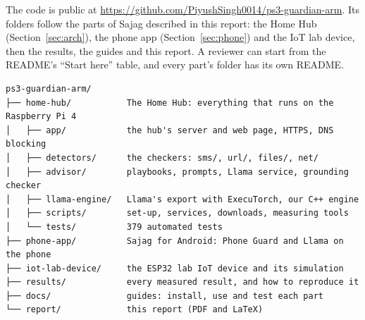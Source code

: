 \documentclass[11pt,a4paper]{article}
\newcommand{\repourl}{\url{https://github.com/PiyushSingh0014/ps3-guardian-arm}}
\begin{document}
The code is public at \repourl. Its folders follow the parts of Sajag described in this report: the Home Hub
(Section~\ref{sec:arch}), the phone app (Section~\ref{sec:phone}) and the IoT lab device, then the results, the guides
and this report. A reviewer can start from the README's ``Start here'' table, and every part's folder has its own README.

\begin{keybox}[title=How the repository is organised]
\small
\begin{verbatim}
ps3-guardian-arm/
├── home-hub/           The Home Hub: everything that runs on the Raspberry Pi 4
│   ├── app/            the hub's server and web page, HTTPS, DNS blocking
│   ├── detectors/      the checkers: sms/, url/, files/, net/
│   ├── advisor/        playbooks, prompts, Llama service, grounding checker
│   ├── llama-engine/   Llama's export with ExecuTorch, our C++ engine
│   ├── scripts/        set-up, services, downloads, measuring tools
│   └── tests/          379 automated tests
├── phone-app/          Sajag for Android: Phone Guard and Llama on the phone
├── iot-lab-device/     the ESP32 lab IoT device and its simulation
├── results/            every measured result, and how to reproduce it
├── docs/               guides: install, use and test each part
└── report/             this report (PDF and LaTeX)
\end{verbatim}
\end{keybox}
\end{document}

